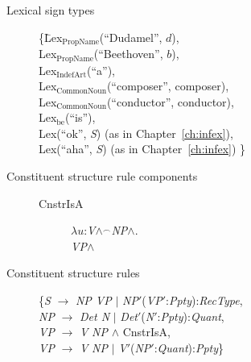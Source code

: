 \begin{description}



\item[Lexical sign types] \mbox{}

\begin{tabbing}
    \{\=Lex$_{\mathrm{PropName}}$(``Dudamel'', $d$), \\
\> Lex$_{\mathrm{PropName}}$(``Beethoven'', $b$), \\
\> Lex$_{\mathrm{IndefArt}}$(``a''), \\
\> Lex$_{\text{CommonNoun}}$(``composer'', composer), \\
\> Lex$_{\text{CommonNoun}}$(``conductor'', conductor), \\
\> Lex$_{\mathrm{be}}$(``is''), \\
\> Lex(``ok'', \textit{S}) (as in Chapter~\ref{ch:infex}),  \\
\> Lex(``aha'', \textit{S}) (as in Chapter~\ref{ch:infex}) \}
\end{tabbing}

\item[Constituent structure rule components] \mbox{}
  \begin{description}

    \item[\textnormal{CnstrIsA}] \mbox{}

  $\lambda
u$:\textit{V}\d{$\wedge$}$^{\frown}$\textit{NP}\d{$\wedge$}. \\
\hspace*{1em} \textit{VP}\d{$\wedge$} 

  \end{description}
  


\item[Constituent structure rules] \mbox{}
  
  \begin{tabbing}
    \{\=\textit{S} $\longrightarrow$ \textit{NP VP} $\mid$ \textit{NP}$'$(\textit{VP}$'$:\textit{Ppty}):\textit{RecType},\\
    \>\textit{NP} $\longrightarrow$ \textit{Det N} $\mid$
    \textit{Det}$'$(\textit{N}$'$:\textit{Ppty}):\textit{Quant},\\
    \>\textit{VP} $\longrightarrow$ \textit{V} \textit{NP}
    \d{\d{$\wedge$}} CnstrIsA, \\
    \>\textit{VP} $\longrightarrow$ \textit{V} \textit{NP} $\mid$
    \textit{V}$'$(\textit{NP}$'$:\textit{Quant}):\textit{Ppty}\}

  \end{tabbing}

\end{description}
